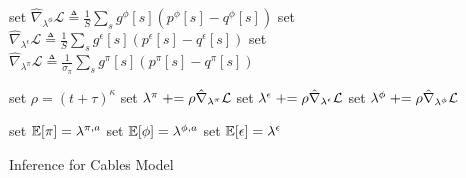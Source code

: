 \begin{algorithm}
{	
	set $\hat\nabla_{\lambda^{\phi} }\mathcal{L} \triangleq \frac{1}{S} \sum_s g^\phi[s] ( p^\phi[s] -  q^\phi[s] )$ \;
	set $\hat\nabla_{\lambda^{\epsilon}} \mathcal{L} \triangleq \frac{1}{S} \sum_s g^\epsilon[s] ( p^\epsilon[s] -  q^\epsilon[s] )$ \;
	set $\hat\nabla_{\lambda^{\pi}} \mathcal{L} \triangleq \frac{1}{\sigma_\pi} \sum_s g^\pi[s] ( p^\pi[s] -  q^\pi[s] )$ \;

	\BlankLine
	set $\rho= (t +\tau)^\kappa$ \;
	set $\lambda^{\pi} \mathrel{+}= \rho \hat\nabla_{\lambda^{\pi}} \mathcal{L}$ \;
	set $\lambda^{\epsilon} \mathrel{+}= \rho \hat\nabla_{\lambda^{\epsilon}} \mathcal{L}$ \;
	set $\lambda^{\phi} \mathrel{+}= \rho \hat\nabla_{\lambda^{\phi}} \mathcal{L}$ \;
}

set $\mathbb{E}[\pi] = \lambda^{\pi,a}$ \;
set $\mathbb{E}[\phi] = \lambda^{\phi,a}$ \;
set $\mathbb{E}[\epsilon] = \lambda^{\epsilon}$ \;
\BlankLine
\Return{$\E[\pi]$, $\E[\phi]$, $\E[\epsilon]$} \;
\caption{Inference for Cables Model}
\label{alg:cables}
\end{algorithm}




